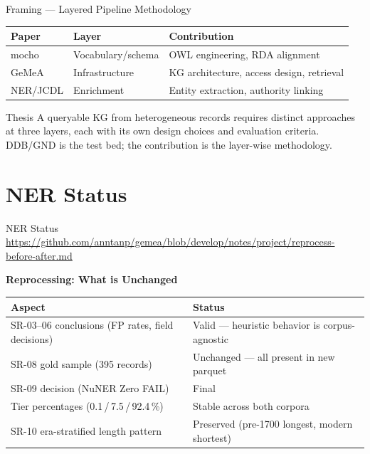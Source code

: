 \documentclass[xcolor,aspectratio=169,compress]{beamer}
\begin{document}
\begin{frame}{Framing --- Layered Pipeline Methodology}
  \small
  \begin{tabular}{llp{6.5cm}}
    \toprule
    Paper & Layer & Contribution \\
    \midrule
    mocho    & Vocabulary/schema  & OWL engineering, RDA alignment \\
    GeMeA    & Infrastructure     & KG architecture, access design, retrieval \\
    NER/JCDL & Enrichment         & Entity extraction, authority linking \\
    \bottomrule
  \end{tabular}

  \medskip
  \begin{block}{Thesis}
    \footnotesize
    A queryable KG from heterogeneous records requires distinct approaches at three layers,
    each with its own design choices and evaluation criteria. DDB/GND is the test bed;
    the contribution is the layer-wise methodology.
  \end{block}

\end{frame}


\section{NER Status}

\begin{frame}{NER Status}
  {\footnotesize\url{https://github.com/anntanp/gemea/blob/develop/notes/project/reprocess-before-after.md}}
  \par\smallskip
  \textbf{Reprocessing: What is Unchanged}\par\smallskip
  \small
  \begin{tabular}{lp{5cm}}
    \toprule
    Aspect & Status \\
    \midrule
    SR-03--06 conclusions (FP rates, field decisions) & Valid --- heuristic behavior is corpus-agnostic \\
    SR-08 gold sample (395 records)                   & Unchanged --- all present in new parquet \\
    SR-09 decision (NuNER Zero FAIL)                  & Final \\
    Tier percentages (0.1\,/\,7.5\,/\,92.4\,\%)      & Stable across both corpora \\
    SR-10 era-stratified length pattern               & Preserved (pre-1700 longest, modern shortest) \\
    \bottomrule
  \end{tabular}
\end{frame}
\end{document}
